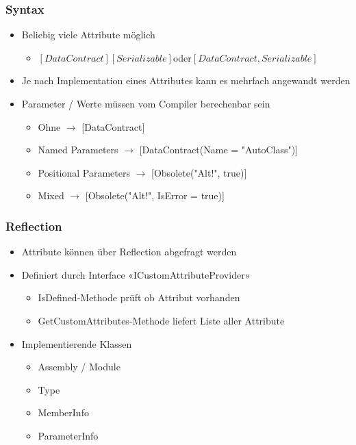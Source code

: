 \subsubsection{Syntax}
\begin{itemize}
    \item Beliebig viele Attribute möglich
    \begin{itemize}
        \item $[DataContract][Serializable] $oder$ [DataContract, Serializable]$
    \end{itemize}
    \item Je nach Implementation eines Attributes kann es mehrfach angewandt werden
    \item Parameter / Werte müssen vom Compiler berechenbar sein
    \begin{itemize}
        \item Ohne $\rightarrow$ [DataContract]
        \item Named Parameters $\rightarrow$ [DataContract(Name = "AutoClass")]
        \item Positional Parameters $\rightarrow$ [Obsolete("Alt!", true)]
        \item Mixed $\rightarrow$ [Obsolete("Alt!", IsError = true)]
    \end{itemize}
\end{itemize}

\subsubsection{Reflection}
\begin{itemize}
    \item Attribute können über Reflection abgefragt werden
    \item Definiert durch Interface «ICustomAttributeProvider»
    \begin{itemize}
        \item IsDefined-Methode prüft ob Attribut vorhanden
        \item GetCustomAttributes-Methode liefert Liste aller Attribute
    \end{itemize}
    \item Implementierende Klassen
    \begin{itemize}
        \item Assembly / Module
        \item Type
        \item MemberInfo
        \item ParameterInfo
    \end{itemize}
\end{itemize}


